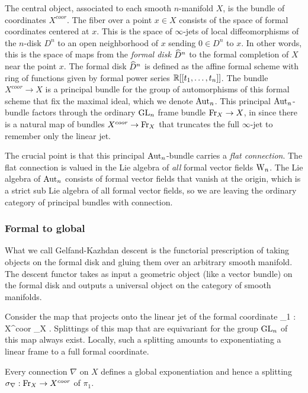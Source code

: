 The central object, associated to each smooth $n$-manifold $X$, is the bundle of coordinates $X^{coor}$. 
The fiber over a point $x \in X$ consists of the space of formal coordinates centered at $x$. 
This is the space of $\infty$-jets of local diffeomorphisms of the $n$-disk $D^n$ to an open neighborhood of $x$ sending $0 \in D^n$ to $x$. 
In other words, this is the space of maps from the {\em formal disk} $\widehat{D}^n$ to the formal completion of $X$ near the point $x$. 
The formal disk $\widehat{D}^n$ is defined as the affine formal scheme with ring of functions given by formal power series $\mathbb R[[t_1,\ldots,t_n]]$.
The bundle $X^{coor} \to X$ is a principal bundle for the group of automorphisms of this formal scheme that fix the maximal ideal, which we denote ${\rm Aut}_n$. 
This principal ${\rm Aut}_n$-bundle factors through the ordinary ${\rm GL}_n$ frame bundle ${\rm Fr}_X \to X$, in since there is a natural map of bundles $X^{coor} \to {\rm Fr}_X$ that truncates the full $\infty$-jet to remember only the linear jet. 

The crucial point is that this principal ${\rm Aut}_n$-bundle carries a {\em flat connection}. 
The flat connection is valued in the Lie algebra of {\em all} formal vector fields ${{\rm W}_n}$.	
The Lie algebra of ${\rm Aut}_n$ consists of formal vector fields that vanish at the origin, which is a strict sub Lie algebra of all formal vector fields, so we are leaving the ordinary category of principal bundles with connection. 

\subsubsection{Formal to global}

What we call Gelfand-Kazhdan descent is the functorial prescription of taking objects on the formal disk and gluing them over an arbitrary smooth manifold.
The descent functor takes as input a geometric object (like a vector bundle) on the formal disk and outputs a universal object on the category of smooth manifolds. 

Consider the map that projects onto the linear jet of the formal coordinate
\ben
\pi_1 : X^{coor} \to \Fr_X .
\een
Splittings of this map that are equivariant for the group ${\rm GL}_n$ of this map always exist. 
Locally, such a splitting amounts to exponentiating a linear frame to a full formal coordinate.

\begin{rmk}
Every  connection $\nabla$ on $X$ defines a global exponentiation and hence a splitting $\sigma_\nabla : {\rm Fr}_X \to X^{coor}$ of $\pi_1$. 
\end{rmk}

